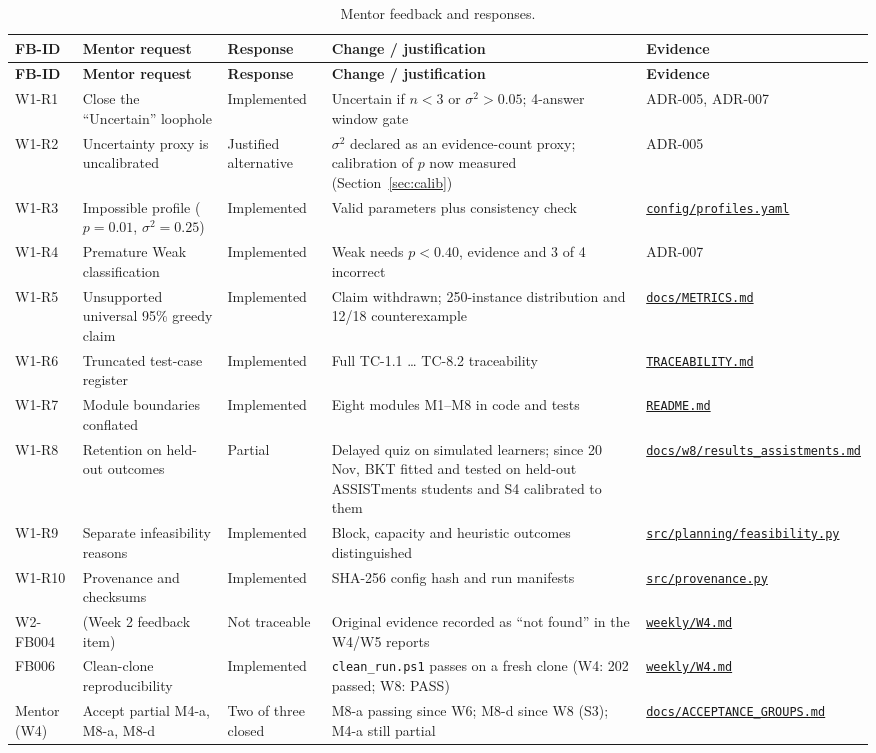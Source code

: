 \documentclass[english]{sintr}
\newcommand{\repourl}{https://github.com/Bhuvan-56/adaptive-learning-path-planner-DAT}
\newcommand{\sha}{cs5903-final-2026}
\DeclareRobustCommand{\rf}[1]{\href{\repourl/blob/\sha/#1}{\nolinkurl{#1}}}
\newcommand{\shax}{cs5903-final-2026}
\DeclareRobustCommand{\rfx}[1]{\href{\repourl/blob/\shax/#1}{\nolinkurl{#1}}}
\begin{document}
{\small
\begin{longtable}{|L{1.43cm}|L{3.05cm}|L{1.97cm}|L{4.66cm}|L{3.05cm}|}
\caption{Mentor feedback and responses.}\\
\hline
\textbf{FB-ID} & \textbf{Mentor request} & \textbf{Response} & \textbf{Change / justification} & \textbf{Evidence} \\ \hline
\endfirsthead
\hline \textbf{FB-ID} & \textbf{Mentor request} & \textbf{Response} & \textbf{Change / justification} & \textbf{Evidence} \\ \hline
\endhead
W1-R1 & Close the ``Uncertain'' loophole & Implemented & Uncertain if $n<3$ or $\sigma^2>0.05$; 4-answer window gate & ADR-005, ADR-007 \\ \hline
W1-R2 & Uncertainty proxy is uncalibrated & Justified alternative & $\sigma^2$ declared as an evidence-count proxy; calibration of $p$ now measured (Section~\ref{sec:calib}) & ADR-005 \\ \hline
W1-R3 & Impossible profile ($p=0.01$, $\sigma^2=0.25$) & Implemented & Valid parameters plus consistency check & \rf{config/profiles.yaml} \\ \hline
W1-R4 & Premature Weak classification & Implemented & Weak needs $p<0.40$, evidence and 3 of 4 incorrect & ADR-007 \\ \hline
W1-R5 & Unsupported universal 95\% greedy claim & Implemented & Claim withdrawn; 250-instance distribution and 12/18 counterexample & \rf{docs/METRICS.md} \\ \hline
W1-R6 & Truncated test-case register & Implemented & Full TC-1.1 \ldots{} TC-8.2 traceability & \rf{TRACEABILITY.md} \\ \hline
W1-R7 & Module boundaries conflated & Implemented & Eight modules M1--M8 in code and tests & \rf{README.md} \\ \hline
W1-R8 & Retention on held-out outcomes & Partial & Delayed quiz on simulated learners; since 20 Nov, BKT fitted and tested on held-out ASSISTments students and S4 calibrated to them & \rfx{docs/w8/results_assistments.md} \\ \hline
W1-R9 & Separate infeasibility reasons & Implemented & Block, capacity and heuristic outcomes distinguished & \rf{src/planning/feasibility.py} \\ \hline
W1-R10 & Provenance and checksums & Implemented & SHA-256 config hash and run manifests & \rf{src/provenance.py} \\ \hline
W2-FB004 & (Week 2 feedback item) & Not traceable & Original evidence recorded as ``not found'' in the W4/W5 reports & \rf{weekly/W4.md} \\ \hline
FB006 & Clean-clone reproducibility & Implemented & \texttt{clean\_run.ps1} passes on a fresh clone (W4: 202 passed; W8: PASS) & \rf{weekly/W4.md} \\ \hline
Mentor (W4) & Accept partial M4-a, M8-a, M8-d & Two of three closed & M8-a passing since W6; M8-d since W8 (S3); M4-a still partial & \rf{docs/ACCEPTANCE_GROUPS.md} \\ \hline
\end{longtable}
}
\end{document}
